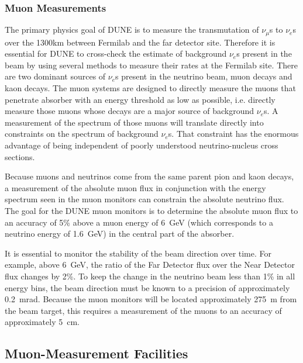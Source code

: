 \subsubsection{Muon Measurements}
\label{subsubsec:detectors-nd-blm-muon-meas}

The primary physics goal of DUNE is to measure the transmutation
of $\nu_\mu$s to $\nu_e$s over the 1300km between Fermilab
and the far detector site.
Therefore it is essential for DUNE to cross-check the estimate of 
background $\nu_e$s present in the beam by using several
methods to measure their rates at the Fermilab site. 
There are two dominant sources of $\nu_e$s present in the
neutrino beam, muon decays and kaon decays. 
The muon systems are designed to directly measure the 
muons that penetrate absorber with an energy 
threshold as low as possible, i.e. directly measure those muons 
whose decays are a major source of background $\nu_e$s. 
A measurement of the spectrum of those muons will translate
 directly into constraints on the spectrum of background $\nu_e$s.
That constraint has the enormous advantage of being independent of poorly understood 
neutrino-nucleus cross sections.

Because muons and neutrinos come from the same parent pion and kaon
decays, a measurement of the absolute muon flux in conjunction with the energy spectrum
seen in the muon monitors can constrain the absolute neutrino flux.  
The goal for the DUNE muon monitors is to determine the absolute muon flux
to an accuracy of 5\% above a muon energy of 6~GeV (which corresponds to
a neutrino energy of 1.6~GeV) in the central part of the absorber.

It is essential to monitor the stability of the beam direction over
time. For example, above 6~GeV, the ratio of the Far Detector flux over 
the Near Detector flux changes by 2\%.  
To keep the change in the neutrino beam less than 1\% in all energy bins,
the beam direction must be known to a precision of approximately 0.2~mrad. 
Because the muon monitors will be located approximately 275~m
from the beam target, this requires a measurement of the muons to an
accuracy of approximately 5~cm.

%
%
\subsection{Muon-Measurement Facilities}
\label{subsec:detectors-nd-blm-muon-measurement-facilities}

